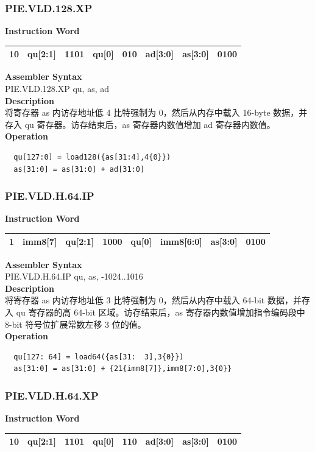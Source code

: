 \newpage
\subsubsection{PIE.VLD.128.XP}\label{instruction:PIEVLD128XP}
\setlength\tabcolsep{6pt}
\textbf{Instruction Word} \\
\begin{tabular}{|c|c|c|c|c|c|c|c|}
	\hline
	10 & qu[2:1] & 1101 & qu[0] & 010 & ad[3:0] & as[3:0] & 0100 \\
	\hline
\end{tabular}

\textbf{Assembler Syntax} \\
PIE.VLD.128.XP qu, as, ad \\
\textbf{Description} \\
将寄存器 as 内访存地址低 4 比特强制为 0，然后从内存中载入 16-byte 数据，并存入 qu 寄存器。访存结束后，as 寄存器内数值增加 ad 寄存器内数值。\\
\textbf{Operation}
\begin{lstlisting}
  qu[127:0] = load128({as[31:4],4{0}})
  as[31:0] = as[31:0] + ad[31:0]
\end{lstlisting}

\newpage
\subsubsection{PIE.VLD.H.64.IP}\label{instruction:PIEVLDH64IP}
\setlength\tabcolsep{6pt}
\textbf{Instruction Word} \\
\begin{tabular}{|c|c|c|c|c|c|c|c|}
	\hline
	1 & imm8[7] & qu[2:1] & 1000 & qu[0] & imm8[6:0] & as[3:0] & 0100 \\
	\hline
\end{tabular}

\textbf{Assembler Syntax} \\
PIE.VLD.H.64.IP qu, as, -1024..1016 \\
\textbf{Description} \\
将寄存器 as 内访存地址低 3 比特强制为 0，然后从内存中载入 64-bit 数据，并存入 qu 寄存器的高 64-bit 区域。访存结束后，as 寄存器内数值增加指令编码段中 8-bit 符号位扩展常数左移 3 位的值。\\
\textbf{Operation}
\begin{lstlisting}
  qu[127: 64] = load64({as[31:  3],3{0}})
  as[31:0] = as[31:0] + {21{imm8[7]},imm8[7:0],3{0}}
\end{lstlisting}

\newpage
\subsubsection{PIE.VLD.H.64.XP}\label{instruction:PIEVLDH64XP}
\setlength\tabcolsep{6pt}
\textbf{Instruction Word} \\
\begin{tabular}{|c|c|c|c|c|c|c|c|}
	\hline
	10 & qu[2:1] & 1101 & qu[0] & 110 & ad[3:0] & as[3:0] & 0100 \\
	\hline
\end{tabular}

